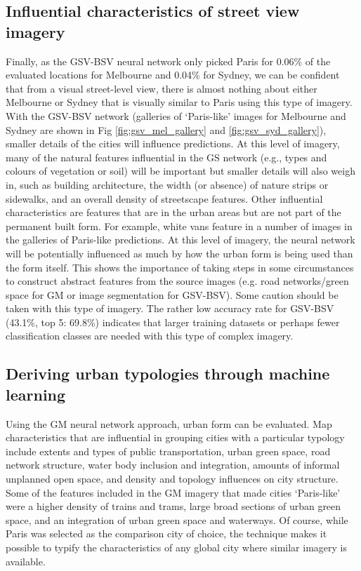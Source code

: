 \documentclass[10pt,letterpaper,hidelinks]{article}
\begin{document}
\subsection*{Influential characteristics of street view imagery}
Finally, as the GSV-BSV neural network only picked Paris for 0.06\% of the evaluated locations for Melbourne and 0.04\% for Sydney, we can be confident that from a visual street-level view, there is almost nothing about either Melbourne or Sydney that is visually similar to Paris using this type of imagery. With the GSV-BSV network (galleries of `Paris-like' images for Melbourne and Sydney are shown in Fig \ref{fig:gsv_mel_gallery} and  \ref{fig:gsv_syd_gallery}), smaller details of the cities will influence predictions. At this level of imagery, many of the natural features influential in the GS network (e.g., types and colours of vegetation or soil) will be important but smaller details will also weigh in, such as building architecture, the width (or absence) of nature strips or sidewalks, and an overall density of streetscape features. Other influential characteristics are features that are in the urban areas but are not part of the permanent built form. For example, white vans feature in a number of images in the galleries of Paris-like predictions. At this level of imagery, the neural network will be potentially influenced as much by how the urban form is being used than the form itself. This shows the importance of taking steps in some circumstances to construct abstract features from the source images (e.g. road networks/green space for GM or image segmentation for GSV-BSV). Some caution should be taken with this type of imagery. The rather low accuracy rate for GSV-BSV (43.1\%, top 5: 69.8\%) indicates that larger training datasets or perhaps fewer classification classes are needed with this type of complex imagery.

\subsection*{Deriving urban typologies through machine learning}
Using the GM neural network approach, urban form can be evaluated. Map characteristics that are influential in grouping cities with a particular typology include extents and types of public transportation, urban green space, road network structure, water body inclusion and integration, amounts of informal unplanned open space, and density and topology influences on city structure. Some of the features included in the GM imagery that made cities `Paris-like' were a higher density of trains and trams, large broad sections of urban green space, and an integration of urban green space and waterways. Of course, while Paris was selected as the comparison city of choice, the technique makes it possible to typify the characteristics of any global city where similar imagery is available.
\end{document}
